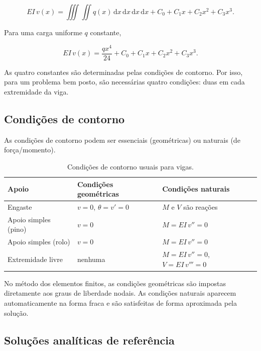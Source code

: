\documentclass[12pt,a4paper]{article}
\newcommand{\dd}{\mathrm{d}}
\begin{document}
\begin{equation}
  EI\,v(x) =
  \iiint\!\!\iint q(x)\,\dd x\,\dd x\,\dd x\,\dd x
  + C_0 + C_1 x + C_2 x^2 + C_3 x^3.
  \label{eq:integracao}
\end{equation}

Para uma carga uniforme \(q\) constante,

\begin{equation}
  EI\,v(x) = \frac{q x^4}{24} + C_0 + C_1 x + C_2 x^2 + C_3 x^3.
  \label{eq:integracao_q}
\end{equation}

As quatro constantes são determinadas pelas condições de contorno. Por isso, para um problema bem posto, são necessárias quatro condições: duas em cada extremidade da viga.

\subsection{Condições de contorno}

As condições de contorno podem ser essenciais (geométricas) ou naturais (de força/momento).

\begin{table}[H]
  \centering
  \caption{Condições de contorno usuais para vigas.}
  \label{tab:cc}
  \footnotesize
  \begin{tabular}{@{}>{\raggedright\arraybackslash}p{3.2cm}>{\raggedright\arraybackslash}p{5.2cm}>{\raggedright\arraybackslash}p{5.2cm}@{}}
    \toprule
    Apoio & Condições geométricas & Condições naturais \\
    \midrule
    Engaste & \(v=0\), \(\theta=v'=0\) & \(M\) e \(V\) são reações \\
    Apoio simples (pino) & \(v=0\) & \(M=EI\,v''=0\) \\
    Apoio simples (rolo) & \(v=0\) & \(M=EI\,v''=0\) \\
    Extremidade livre & nenhuma & \(M=EI\,v''=0\), \(V=EI\,v'''=0\) \\
    \bottomrule
  \end{tabular}
\end{table}

No método dos elementos finitos, as condições geométricas são impostas diretamente aos graus de liberdade nodais. As condições naturais aparecem automaticamente na forma fraca e são satisfeitas de forma aproximada pela solução.

\subsection{Soluções analíticas de referência}
\label{sec:analitico}
\end{document}
